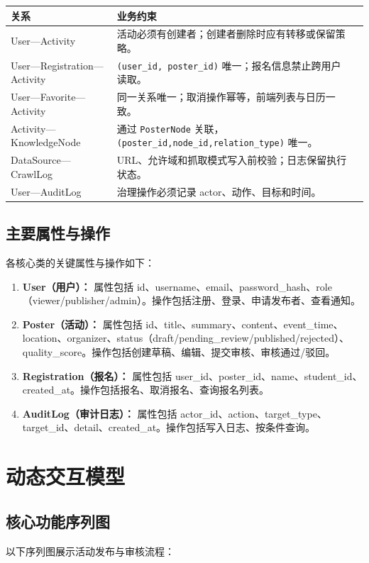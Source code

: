 \documentclass[12pt,a4paper]{ctexart}
\begin{document}
\noindent\begin{tabularx}{\textwidth}{p{2.5cm}p{6.0cm}Y}
\toprule 关系 & 业务约束 \\\midrule
User—Activity & 活动必须有创建者；创建者删除时应有转移或保留策略。 \\
User—Registration—Activity & \texttt{(user\_id, poster\_id)} 唯一；报名信息禁止跨用户读取。 \\
User—Favorite—Activity & 同一关系唯一；取消操作幂等，前端列表与日历一致。 \\
Activity—KnowledgeNode & 通过 \texttt{PosterNode} 关联，\texttt{(poster\_id,node\_id,relation\_type)} 唯一。 \\
DataSource—CrawlLog & URL、允许域和抓取模式写入前校验；日志保留执行状态。 \\
User—AuditLog & 治理操作必须记录 actor、动作、目标和时间。 \\
\bottomrule
\end{tabularx}

\subsection{主要属性与操作}
各核心类的关键属性与操作如下：

\begin{enumerate}
\item \textbf{User（用户）：} 属性包括 id、username、email、password\_hash、role（viewer/publisher/admin）。操作包括注册、登录、申请发布者、查看通知。
\item \textbf{Poster（活动）：} 属性包括 id、title、summary、content、event\_time、location、organizer、status（draft/pending\_review/published/rejected）、quality\_score。操作包括创建草稿、编辑、提交审核、审核通过/驳回。
\item \textbf{Registration（报名）：} 属性包括 user\_id、poster\_id、name、student\_id、created\_at。操作包括报名、取消报名、查询报名列表。
\item \textbf{AuditLog（审计日志）：} 属性包括 actor\_id、action、target\_type、target\_id、detail、created\_at。操作包括写入日志、按条件查询。
\end{enumerate}

\section{动态交互模型}
\subsection{核心功能序列图}
以下序列图展示活动发布与审核流程：
\end{document}
